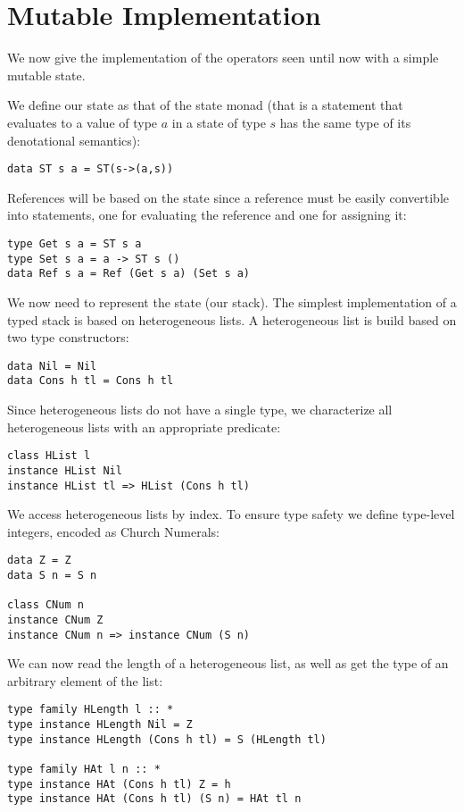\section{Mutable Implementation}
We now give the implementation of the operators seen until now with a simple mutable state.

We define our state as that of the state monad (that is a statement that evaluates to a value of type $a$ in a state of type $s$ has the same type of its denotational semantics):
\begin{verbatim}
data ST s a = ST(s->(a,s))
\end{verbatim}

References will be based on the state since a reference must be easily convertible into statements, one for evaluating the reference and one for assigning it:
\begin{verbatim}
type Get s a = ST s a
type Set s a = a -> ST s ()
data Ref s a = Ref (Get s a) (Set s a)
\end{verbatim}

We now need to represent the state (our stack). The simplest implementation of a typed stack is based on heterogeneous lists. A heterogeneous list is build based on two type constructors:
\begin{verbatim}
data Nil = Nil
data Cons h tl = Cons h tl
\end{verbatim}

Since heterogeneous lists do not have a single type, we characterize all heterogeneous lists with an appropriate predicate:
\begin{verbatim}
class HList l
instance HList Nil
instance HList tl => HList (Cons h tl)
\end{verbatim}

We access heterogeneous lists by index. To ensure type safety we define type-level integers, encoded as Church Numerals:
\begin{verbatim}
data Z = Z
data S n = S n

class CNum n
instance CNum Z
instance CNum n => instance CNum (S n)
\end{verbatim}

We can now read the length of a heterogeneous list, as well as get the type of an arbitrary element of the list:

\begin{verbatim}
type family HLength l :: *
type instance HLength Nil = Z
type instance HLength (Cons h tl) = S (HLength tl)

type family HAt l n :: *
type instance HAt (Cons h tl) Z = h
type instance HAt (Cons h tl) (S n) = HAt tl n
\end{verbatim}

